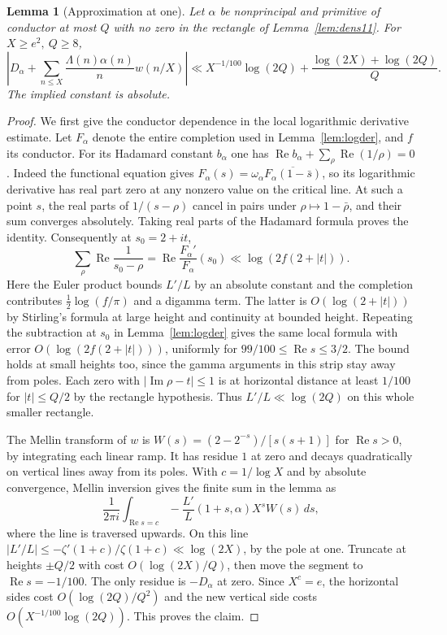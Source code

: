\documentclass[a4paper,11pt]{article}
\newtheorem{lemma}[proposition]{Lemma}
\theoremstyle{definition}
\theoremstyle{remark}
\newcommand{\real}{\operatorname{Re}}\newcommand{\imag}{\operatorname{Im}}
\numberwithin{equation}{section}
\begin{document}
\begin{lemma}[Approximation at one]\label{lem:tail11}
Let \(\alpha\) be nonprincipal and primitive of conductor at most \(Q\) with no zero in the rectangle of Lemma~\ref{lem:dens11}. For \(X\ge e^2,\ Q\ge8\),
\[
 \left|D_\alpha+\sum_{n\le X}\frac{\Lambda(n)\alpha(n)}n w(n/X)\right|
 \ll X^{-1/100}\log(2Q)+\frac{\log(2X)+\log(2Q)}{Q}.
\]
The implied constant is absolute.
\end{lemma}
\begin{proof}
We first give the conductor dependence in the local logarithmic derivative estimate. Let \(F_\alpha\) denote the entire completion used in Lemma~\ref{lem:logder}, and \(f\) its conductor. For its Hadamard constant \(b_\alpha\) one has
\(\real b_\alpha+\sum_\rho\real(1/\rho)=0\).
Indeed the functional equation gives \(F_\alpha(s)=\omega_\alpha\overline{F_\alpha(1-\bar s)}\), so its logarithmic derivative has real part zero at any nonzero value on the critical line. At such a point \(s\), the real parts of \(1/(s-\rho)\) cancel in pairs under \(\rho\mapsto1-\bar\rho\), and their sum converges absolutely. Taking real parts of the Hadamard formula proves the identity. Consequently at \(s_0=2+it\),
\[
 \sum_\rho\real\frac1{s_0-\rho}
   =\real\frac{F_\alpha'}{F_\alpha}(s_0)
                 \ll \log(2f(2+|t|)).
\]
Here the Euler product bounds \(L'/L\) by an absolute constant and the completion contributes \(\frac12\log(f/\pi)\) and a digamma term. The latter is \(O(\log(2+|t|))\) by Stirling's formula at large height and continuity at bounded height. Repeating the subtraction at \(s_0\) in Lemma~\ref{lem:logder} gives the same local formula with error \(O(\log(2f(2+|t|)))\), uniformly for \(99/100\le\real s\le3/2\). The bound holds at small heights too, since the gamma arguments in this strip stay away from poles. Each zero with \(|\imag\rho-t|\le1\) is at horizontal distance at least \(1/100\) for \(|t|\le Q/2\) by the rectangle hypothesis. Thus \(L'/L\ll\log(2Q)\) on this whole smaller rectangle.

The Mellin transform of \(w\) is \(W(s)=(2-2^{-s})/[s(s+1)]\) for \(\real s>0\), by integrating each linear ramp. It has residue \(1\) at zero and decays quadratically on vertical lines away from its poles. With \(c=1/\log X\) and by absolute convergence, Mellin inversion gives the finite sum in the lemma as
\[
 \frac1{2\pi i}\int_{\real s=c}
              -\frac{L'}{L}(1+s,\alpha)X^s W(s)\,ds ,
\]
where the line is traversed upwards. On this line \(|L'/L|\le-\zeta'(1+c)/\zeta(1+c)\ll \log(2X)\), by the pole at one. Truncate at heights \(\pm Q/2\) with cost \(O(\log(2X)/Q)\), then move the segment to \(\real s=-1/100\). The only residue is \(-D_\alpha\) at zero. Since \(X^c=e\), the horizontal sides cost \(O(\log(2Q)/Q^2)\) and the new vertical side costs \(O(X^{-1/100}\log(2Q))\). This proves the claim.
\end{proof}
\end{document}
